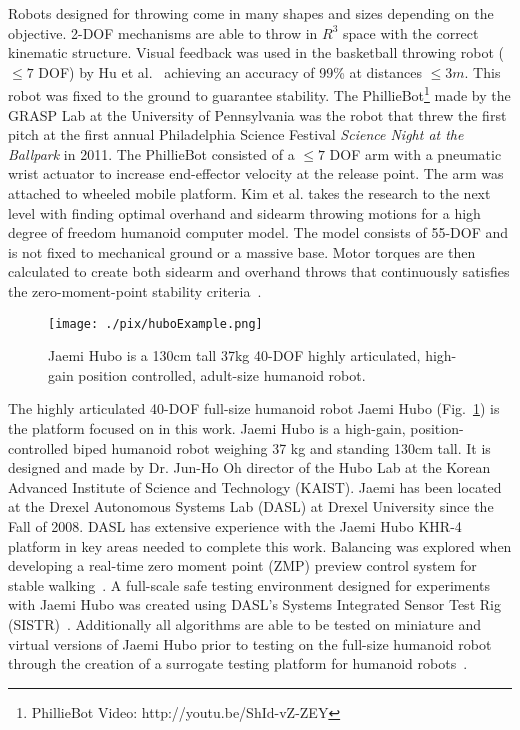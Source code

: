 Robots designed for throwing come in many shapes and sizes depending on the objective.  
2-DOF mechanisms are able to throw in $R^3$ space with the correct kinematic structure.  
Visual feedback was used in the basketball throwing robot ($\leq 7$ DOF) by Hu et al.~\cite{5649335} achieving an accuracy of 99\% at distances $\leq 3m$.  
This robot was fixed to the ground to guarantee stability.
The PhillieBot\footnote{PhillieBot Video: http://youtu.be/ShId-vZ-ZEY} made by the GRASP Lab at the University of Pennsylvania was the robot that threw the first pitch at the first annual Philadelphia Science Festival \textit{Science Night at the Ballpark} in 2011.  
The PhillieBot consisted of a $\leq 7$ DOF arm with a pneumatic wrist actuator to increase end-effector velocity at the release point.  
The arm was attached to wheeled mobile platform.
Kim et al. \cite{5686315,JooH2011438} takes the research to the next level with finding optimal overhand and sidearm throwing motions for a high degree of freedom humanoid computer model.  
The model consists of 55-DOF and is not fixed to mechanical ground or a massive base.  
Motor torques are then calculated to create both sidearm and overhand throws that continuously satisfies the zero-moment-point stability criteria~\cite{4309277}.  

\begin{figure}[t]
  \centering
\texttt{[image: ./pix/huboExample.png]}
  \caption{Jaemi Hubo is a 130cm tall 37kg 40-DOF highly articulated, high-gain position controlled, adult-size humanoid robot.}
  \label{fig:huboFig}
\end{figure}


The highly articulated 40-DOF full-size humanoid robot Jaemi Hubo (Fig.~\ref{fig:huboFig}) is the platform focused on in this work.  Jaemi Hubo is a high-gain, position-controlled biped humanoid robot weighing 37 kg and standing 130cm tall.  It is designed and made by Dr. Jun-Ho Oh director of the Hubo Lab at the Korean Advanced Institute of Science and Technology (KAIST).  Jaemi has been located at the Drexel Autonomous Systems Lab (DASL) at Drexel University since the Fall of 2008.  DASL has extensive experience with the Jaemi Hubo KHR-4 platform in key areas needed to complete this work.  Balancing was explored when developing a real-time zero moment point (ZMP) preview control system for stable walking~\cite{5686276}.  A full-scale safe testing environment designed for experiments with Jaemi Hubo was created using DASL's Systems Integrated Sensor Test Rig (SISTR)~\cite{5686325}.  Additionally all algorithms are able to be tested on miniature and virtual versions of Jaemi Hubo prior to testing on the full-size humanoid robot through the creation of a surrogate testing platform for humanoid robots~\cite{5379582}.



